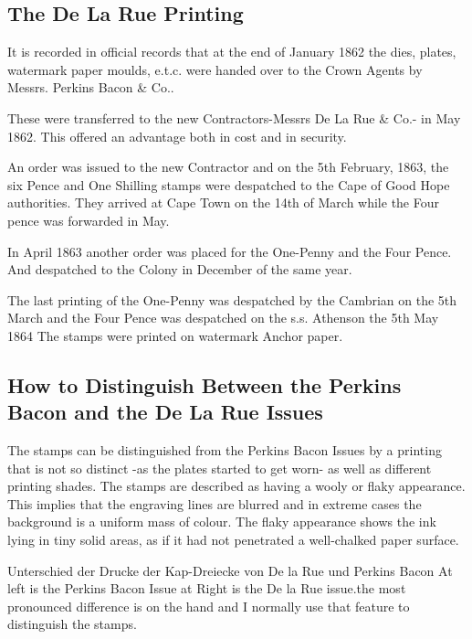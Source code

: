 
\subsection{The De La Rue Printing
} 


It is recorded in official records that at the end of January 1862 the dies, plates, watermark paper moulds, e.t.c. were handed over to the Crown Agents by Messrs. Perkins Bacon \& Co..

These were transferred to the new Contractors-Messrs De La Rue \& Co.- in May 1862. This offered an advantage both in cost and in security.

An order was issued to the new Contractor and on the 5th February, 1863, the six Pence and One Shilling stamps were despatched to the Cape of Good Hope authorities. They arrived at Cape Town on the 14th of March while the Four pence was forwarded in May.


In April 1863 another order was placed for the One-Penny and the Four Pence. And despatched to the Colony in December of the same year.

The last printing of the One-Penny was despatched by the Cambrian on the 5th March and the Four Pence was despatched on the s.s. Athenson the 5th May 1864
The stamps were printed on watermark Anchor paper.

\subsection{How to Distinguish Between the Perkins Bacon and the De La Rue Issues
} 
The stamps can be distinguished from the Perkins Bacon Issues by a printing that is not so distinct -as the plates started to get worn- as well as different printing shades. The stamps are described as having a wooly or flaky appearance. This implies that the engraving lines are blurred and in extreme cases the background is a uniform mass of colour. The flaky appearance shows the ink lying in tiny solid areas, as if it had not penetrated a well-chalked paper surface.



 
Unterschied der Drucke der Kap-Dreiecke von De la Rue und Perkins Bacon
At left is the Perkins Bacon Issue at Right is the De la Rue issue.the most pronounced difference is on the hand and I normally use that feature to distinguish the stamps.

